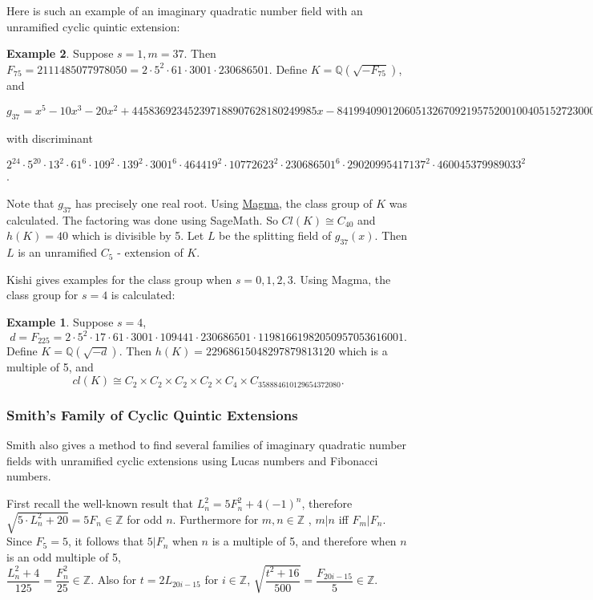 \documentclass[12pt]{extarticle}
\newcommand{\Q}{\mathbb{Q}}
\newcommand{\Z}{\mathbb{Z}}
\newcommand{\<}{\langle}
\renewcommand{\>}{\rangle}
\theoremstyle{definition}
\newtheorem{example}{Example}
\begin{document}
Here is such an example of an imaginary quadratic number field with an unramified cyclic quintic extension:
\begin{example}
Suppose $s=1, m= 37$. Then $F_{75} = 2111485077978050 = 2 \cdot 5^2 \cdot 61 \cdot 3001 \cdot 230686501$. Define $K = \Q(\sqrt{-F_{75}})$, and 

\begin{center}
$g_{37} = x^5 - 10x^3 - 20x^2 + 445836923452397188907628180249985x  - 841994090120605132670921957520010040515272300004
$
\end{center}
with discriminant 

\begin{center}
$2^{24} \cdot 5^{20} \cdot 13^2 \cdot 61^6 \cdot 109^2 \cdot 139^2 \cdot 3001^6 \cdot 464419^2 \cdot 10772623^2 \cdot 230686501^6 \cdot 29020995417137^2 \cdot 460045379989033^2$. 
\end{center}

Note that $g_{37}$ has precisely one real root. Using \href{http://magma.maths.usyd.edu.au/calc/}{Magma}, the class group of $K$ was calculated. The factoring was done using SageMath. So $Cl(K) \cong C_{40} $ and $h(K) = 40$ which is divisible by 5. Let $L$ be the splitting field of $g_{37}(x)$. Then $L$ is an unramified $C_5$ - extension of $K$. 


Kishi gives examples for the class group when $s = 0,1,2,3$. Using Magma, the class group for $s=4$ is calculated:
\begin{example}
Suppose $s=4$, 
\begin{equation}
d = F_{225} = 2 \cdot 5^2 \cdot 17 \cdot 61 \cdot 3001 \cdot 109441 \cdot 230686501 \cdot11981661982050957053616001.
\end{equation} Define $K = \Q(\sqrt{-d})$.
Then $h(K) = 22968615048297879813120$ which is a multiple of 5, and 
\begin{equation}
cl(K) \cong C_2 \times C_2 \times C_2 \times C_2 \times C_4 \times C_{358884610129654372080}.
\end{equation} 
\end{example}
\end{example}


\subsubsection{Smith's Family of Cyclic Quintic Extensions}
Smith \cite{SMITH} also gives a method to find several families of imaginary quadratic number fields with unramified cyclic extensions using Lucas numbers and Fibonacci numbers. \par
 First recall the well-known result that $L_n^2 = 5F_n^2+4(-1)^n$, therefore $\sqrt{5 \cdot L_n^2+20} = 5F_n \in \Z$ for odd $n$. Furthermore for $m,n \in \Z$ , $m|n$ iff $F_m | F_n$. Since $F_5 = 5$, it follows that $5| F_n $ when $n$ is a multiple of 5, and therefore when $n$ is an odd multiple of 5, \\ $\dfrac{L_n^2+4}{125} = \dfrac{F_n^2}{25} \in \Z$. Also for $t = 2L_{20i-15}$ for $i \in \Z$, $\sqrt{\dfrac{t^2+16}{500}} = \dfrac{F_{20i-15}}{5} \in \Z$. \\ \par 
\end{document}
